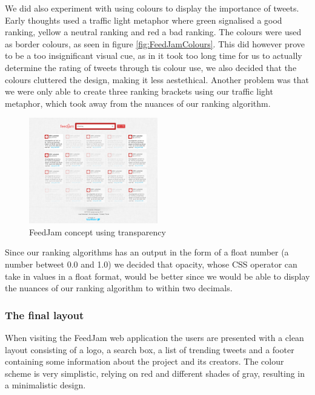 We did also experiment with using colours to display the importance of tweets. Early thoughts used a traffic light metaphor where green signalised a good ranking, yellow a neutral ranking and red a bad ranking. The colours were used as border colours, as seen in figure  \ref{fig:FeedJamColours}. This did however prove to be a too insignificant visual cue, as in it took too long time for us to actually determine the rating of tweets through tis colour use, we also decided that the colours cluttered the design, making it less aestethical. Another problem was that we were only able to create three ranking brackets using our traffic light metaphor, which took away from the nuances of our ranking algorithm.

\begin{figure}[ht]
    \begin{minipage}[b]{1\linewidth}
        \centering
        \includegraphics[width=0.5\textwidth]{figures/layout_transparency}
        \caption{FeedJam concept using transparency}
        \label{fig:FeedJamTransparency}
    \end{minipage}
\end{figure}

Since our ranking algorithms has an output in the form of a float number (a number betweet 0.0 and 1.0) we decided that opacity, whose CSS operator can take in values in a float format, would be better since we would be able to display the nuances of our ranking algorithm to within two decimals.

\subsubsection{The final layout}
When visiting the FeedJam web application the users are presented with a clean layout consisting of a logo, a search box, a list of trending tweets and a footer containing some information about the project and its creators. The colour scheme is very simplistic, relying on red and different shades of gray, resulting in a minimalistic design.

